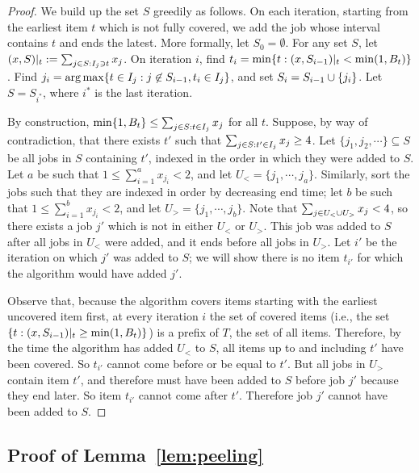 \begin{proof}
    We build up the set $S$ greedily as follows. On each iteration,
    starting from the earliest item $t$ which is not fully covered, we add
    the job whose interval contains $t$ and ends the latest. More formally,
    let $S_0 = \emptyset$. For any set $S$, let $(x,S)|_t := \sum_{j \in S
    : {I_{j}} \ni t} x_j$. On iteration $i$, find $t_i = \min \{t:
    (x,S_{i-1})|_t < \min(1, B_t)\}$. Find $j_i = \operatorname{arg\,max}\{t \in {I_{j}} :
    j \not\in S_{i-1}, t_i \in {I_{j}}\}$, and set $S_i = S_{i-1} \cup
    \{j_i\}$.  Let $S = S_{i^*}$, where $i^*$ is the last iteration.

    By construction, $\min\{1,B_t\}\le\sum_{j\in S: t\in{I_{j}}}x_j$ for all
    $t$.  Suppose, by way of contradiction, that there exists $t'$ such that
    $\sum_{j\in S: t'\in{I_{j}}}x_j \ge 4$. Let $\{j_1,j_2,\cdots\} \subseteq S$
    be all jobs in $S$ containing $t'$, indexed in the order in which they were
    added to $S$. Let $a$ be such that $1 \le \sum_{i=1}^ax_{j_i} < 2$, and let
    $U_< = \{j_1,\cdots,j_a\}$. Similarly, sort the jobs such that they are
    indexed in order by decreasing end time; let $b$  be such that $1 \le
    \sum_{i=1}^bx_{j_i} < 2$, and let $U_> = \{j_1,\cdots,j_b\}$. Note that
    $\sum_{j\in U_< \cup U_>} x_j < 4$, so there exists a job $j'$ which is
    not in either $U_<$ or $U_>$. This job was added to $S$ after all jobs in
    $U_<$ were added, and it ends before all jobs in $U_>$. Let $i'$ be the
    iteration on which $j'$ was added to $S$; we will show there is no item
    $t_{i'}$ for which the algorithm would have added $j'$.
    
    Observe that, because the algorithm covers items starting with the earliest
    uncovered item first, at every iteration $i$ the set of covered items
    (i.e., the set $\{t : (x,S_{i-1})|_t \ge \min(1,B_t)\}$) is a prefix of
    $T$, the set of all items. Therefore, by the time the algorithm has added
    $U_<$ to $S$, all items up to and including $t'$ have been covered. So
    $t_{i'}$ cannot come before or be equal to $t'$.  But all jobs in $U_>$
    contain item $t'$, and therefore must have been added to $S$ before job
    $j'$ because they end later. So item $t_{i'}$ cannot come after $t'$.
    Therefore job $j'$ cannot have been added to $S$.
\end{proof}

\subsection{Proof of Lemma~\ref{lem:peeling}}

